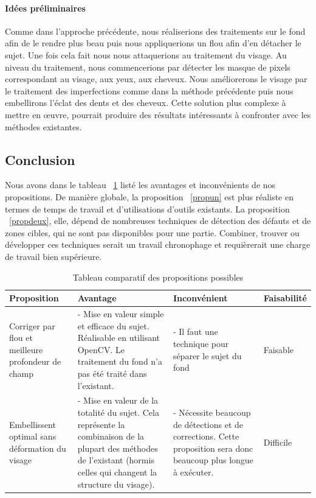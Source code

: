 \documentclass[11pt, french,screen]{report-rd-info}
\begin{document}
\paragraph{Idées préliminaires}
Comme dans l’approche précédente, nous réaliserions des traitements sur le fond afin de le rendre plus beau puis nous appliquerions un flou afin d’en détacher le sujet. Une fois cela fait nous nous attaquerions au traitement du visage. Au niveau du traitement, nous commencerions par détecter les masque de pixels correspondant au visage, aux yeux, aux cheveux. Nous améliorerons le visage par le traitement des imperfections comme dans la méthode précédente puis nous embellirons l’éclat des dents et des cheveux.
Cette solution plus complexe à mettre en œuvre, pourrait produire des résultats intéressants à confronter avec les méthodes existantes.
\subsection{Conclusion}
Nous avons dans le tableau ~\ref{tab:compprop} listé les avantages et inconvénients de nos propositions. De manière globale, la proposition ~\ref{propun} est plus réaliste en termes de temps de travail et d’utilisations d’outils existants. La proposition ~\ref{propdeux}, elle, dépend de nombreuses techniques de détection des défauts et de zones cibles, qui ne sont pas disponibles pour une partie. Combiner, trouver ou développer ces techniques serait un travail chronophage et requièrerait une charge de travail bien supérieure.
\begin{table}
\begin{center}
\begin{tabular}{|p{3cm}|p{4cm}|p{4cm}|p{4cm}|}
\hline
Proposition & Avantage & Inconvénient & Faisabilité \\ \hline
Corriger par flou et meilleure profondeur de champ & - Mise en valeur simple et efficace du sujet. Réalisable en utilisant OpenCV. Le traitement du fond n'a pas été traité dans l'existant. & - Il faut une technique pour séparer le sujet du fond & Faisable \\ \hline
Embellissent optimal sans déformation du visage & - Mise en valeur de la totalité du sujet. Cela représente la combinaison de la plupart des méthodes de l'existant (hormis celles qui changent la structure du visage). & - Nécessite beaucoup de détections et de corrections. Cette proposition sera donc beaucoup plus longue à exécuter. & Difficile \\ \hline
\end{tabular}
\end{center}
\caption{Tableau comparatif des propositions possibles}
\label{tab:compprop}
\end{table}

\listoffigures{}
\listoftables{}
\appendix
\end{document}
